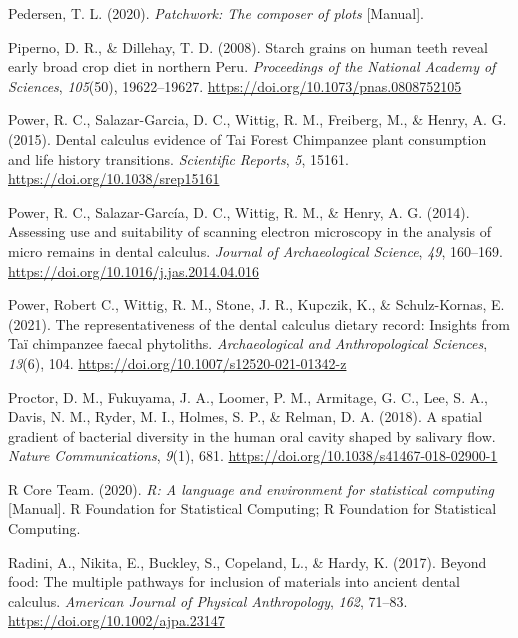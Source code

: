 \documentclass[
  b5paper,
]{book}
\newlength{\cslhangindent}
\newlength{\cslentryspacingunit} %
\newenvironment{CSLReferences}[2] %
 {%
  \setlength{\parindent}{0pt}
  \ifodd #1
  \let\oldpar\par
  \def\par{\hangindent=\cslhangindent\oldpar}
  \fi
  \setlength{\parskip}{#2\cslentryspacingunit}
 }%
 {}
\begin{document}
\begin{CSLReferences}{1}{0}
\leavevmode{}%
Pedersen, T. L. (2020). \emph{Patchwork: {The} composer of plots}
{[}Manual{]}.

\leavevmode{}%
Piperno, D. R., \& Dillehay, T. D. (2008). Starch grains on human teeth
reveal early broad crop diet in northern {Peru}. \emph{Proceedings of
the National Academy of Sciences}, \emph{105}(50), 19622--19627.
\url{https://doi.org/10.1073/pnas.0808752105}

\leavevmode{}%
Power, R. C., Salazar-Garcia, D. C., Wittig, R. M., Freiberg, M., \&
Henry, A. G. (2015). Dental calculus evidence of {Tai Forest Chimpanzee}
plant consumption and life history transitions. \emph{Scientific
Reports}, \emph{5}, 15161. \url{https://doi.org/10.1038/srep15161}

\leavevmode{}%
Power, R. C., Salazar-García, D. C., Wittig, R. M., \& Henry, A. G.
(2014). Assessing use and suitability of scanning electron microscopy in
the analysis of micro remains in dental calculus. \emph{Journal of
Archaeological Science}, \emph{49}, 160--169.
\url{https://doi.org/10.1016/j.jas.2014.04.016}

\leavevmode{}%
Power, Robert C., Wittig, R. M., Stone, J. R., Kupczik, K., \&
Schulz-Kornas, E. (2021). The representativeness of the dental calculus
dietary record: Insights from {Ta{ï}} chimpanzee faecal phytoliths.
\emph{Archaeological and Anthropological Sciences}, \emph{13}(6), 104.
\url{https://doi.org/10.1007/s12520-021-01342-z}

\leavevmode{}%
Proctor, D. M., Fukuyama, J. A., Loomer, P. M., Armitage, G. C., Lee, S.
A., Davis, N. M., Ryder, M. I., Holmes, S. P., \& Relman, D. A. (2018).
A spatial gradient of bacterial diversity in the human oral cavity
shaped by salivary flow. \emph{Nature Communications}, \emph{9}(1), 681.
\url{https://doi.org/10.1038/s41467-018-02900-1}

\leavevmode{}%
R Core Team. (2020). \emph{R: {A} language and environment for
statistical computing} {[}Manual{]}. {R Foundation for Statistical
Computing}; {R Foundation for Statistical Computing}.

\leavevmode{}%
Radini, A., Nikita, E., Buckley, S., Copeland, L., \& Hardy, K. (2017).
Beyond food: {The} multiple pathways for inclusion of materials into
ancient dental calculus. \emph{American Journal of Physical
Anthropology}, \emph{162}, 71--83.
\url{https://doi.org/10.1002/ajpa.23147}


\end{CSLReferences}
\end{document}
